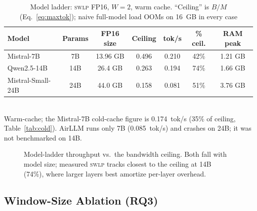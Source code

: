 \documentclass[10pt,a4paper]{article}
\newcommand{\swlp}{\textsc{swlp}}
\begin{document}
\begin{table}[htbp]
\centering
\caption{Model ladder: \swlp{} FP16, $W=2$, warm cache. ``Ceiling'' is
$B/M$ (Eq.~\ref{eq:maxtok}); naive full-model load OOMs on 16~GB in every case}
\label{tab:ladder}
\begin{tabular}{@{}lcccccc@{}}
\toprule
\textbf{Model} & \textbf{Params} & \textbf{FP16 size} & \textbf{Ceiling} & \textbf{tok/s} & \textbf{\% ceil.} & \textbf{RAM peak} \\
\midrule
Mistral-7B & 7B & 13.96 GB & 0.496 & 0.210 & 42\% & 1.21 GB \\
Qwen2.5-14B & 14B & 26.4 GB & 0.263 & 0.194 & 74\% & 1.66 GB \\
Mistral-Small-24B & 24B & 44.0 GB & 0.158 & 0.081 & 51\% & 3.76 GB \\
\bottomrule
\end{tabular}
\\[0.3em]
{\small Warm-cache; the Mistral-7B cold-cache figure is 0.174~tok/s (35\% of
ceiling, Table~\ref{tab:cold}). AirLLM runs only 7B (0.085~tok/s) and crashes on
24B; it was not benchmarked on 14B.}
\end{table}

\begin{figure}[htbp]
\centering
{}
\caption{Model-ladder throughput vs.\ the bandwidth ceiling. Both fall with model
size; measured \swlp{} tracks closest to the ceiling at 14B (74\%), where larger
layers best amortize per-layer overhead.}
\label{fig:ladder}
\end{figure}

\subsection{Window-Size Ablation (RQ3)}
\label{subsec:window}
\end{document}
